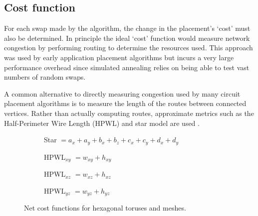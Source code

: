 		\subsection{Cost function}
			
			For each swap made by the algorithm, the change in the placement's `cost'
			must also be determined. In principle the ideal `cost' function would
			measure network congestion by performing routing to determine the
			resources used. This approach was used by early application placement
			algorithms \cite{steele85} but incurs a very large performance overhead
			since simulated annealing relies on being able to test vast numbers of
			random swaps.
			
			A common alternative to directly measuring congestion used by many
			circuit placement algorithms is to measure the length of the routes
			between connected vertices. Rather than actually computing routes,
			approximate metrics such as the Half-Perimeter Wire Length (HPWL) and
			star model are used \cite{kahng11}.
			
			\begin{figure}
				\center
				\begin{subfigure}[b]{\linewidth}
					\center
					
					\caption{Star $= a_x + a_y + b_x + b_z + c_x + c_y + d_x + d_y$}
					\label{fig:cost-function-star}
				\end{subfigure}
				
				\vspace*{1.5em}
				
				\begin{subfigure}[b]{0.32\linewidth}
					\center
					
					\caption{HPWL$_{xy}$ $= w_{xy} + h_{xy}$}
					\label{fig:cost-function-hpwl-xy}
				\end{subfigure}
				\begin{subfigure}[b]{0.32\linewidth}
					\center
					
					\caption{HPWL$_{xz}$ $= w_{xz} + h_{xz}$}
					\label{fig:cost-function-hpwl-xz}
				\end{subfigure}
				\begin{subfigure}[b]{0.32\linewidth}
					\center
					
					\caption{HPWL$_{yz}$ $= w_{yz} + h_{yz}$}
					\label{fig:cost-function-hpwl-yz}
				\end{subfigure}
				
				\caption{Net cost functions for hexagonal toruses and meshes.}
				\label{fig:cost-function}
			\end{figure}
			
